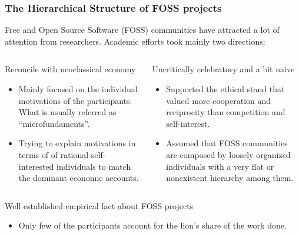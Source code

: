 \documentclass[ignorenonframetext,red,8pt,notes=hide]{beamer}
\begin{document}
\begin{frame}
\frametitle{The Hierarchical Structure of FOSS projects}

Free and Open Source Software (FOSS) communities have attracted a lot of attention from researchers. Academic efforts took mainly two directions:

\begin{columns}[c]
\begin{column}{0.5\textwidth}
\begin{block}{Reconcile with neoclassical economy}
\begin{itemize}
\item Mainly focused on the individual motivations of the participants. What is usually referred as ``microfundaments''.
\item Trying to explain motivations in terms of of rational self-interested individuals to match the dominant economic accounts.
\end{itemize}
\end{block}
\end{column}

\pause

\begin{column}{0.5\textwidth}

\begin{block}{Uncritically celebratory and a bit naive}
\begin{itemize}
\item Supported the ethical stand that valued more cooperation and reciprocity than competition and self-interest.
\item Assumed that FOSS communities are composed by loosely organized individuals with a very flat or nonexistent hierarchy among them.
\end{itemize}
\end{block}
\end{column}
\end{columns}

\pause


\begin{block}{Well established empirical fact about FOSS projects}
\begin{itemize}
\item Only few of the participants account for the lion's share of the work done.
\end{itemize}
\end{block}

\end{frame}
\end{document}
